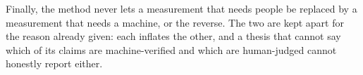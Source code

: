 Finally, the method never lets a measurement that needs people be replaced by a
measurement that needs a machine, or the reverse. The two are kept apart for
the reason already given: each inflates the other, and a thesis that cannot say
which of its claims are machine-verified and which are human-judged cannot
honestly report either.
